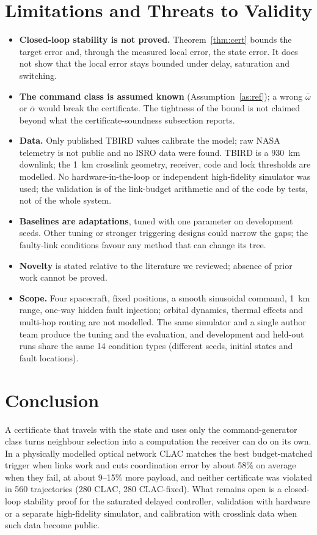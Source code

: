 \documentclass[journal]{IEEEtran}
\begin{document}
\section{Limitations and Threats to Validity}\label{sec:limits}
\begin{itemize}
\item \textbf{Closed-loop stability is not proved.} Theorem~\ref{thm:cert} bounds the target error and, through the measured local error, the state error. It does not show that the local error stays bounded under delay, saturation and switching.
\item \textbf{The command class is assumed known} (Assumption~\ref{as:ref}); a wrong $\bar\omega$ or $\bar\alpha$ would break the certificate. The tightness of the bound is not claimed beyond what the certificate-soundness subsection reports.
\item \textbf{Data.} Only published TBIRD values calibrate the model; raw NASA telemetry is not public and no ISRO data were found. TBIRD is a 930~km downlink; the 1~km crosslink geometry, receiver, code and lock thresholds are modelled. No hardware-in-the-loop or independent high-fidelity simulator was used; the validation is of the link-budget arithmetic and of the code by tests, not of the whole system.
\item \textbf{Baselines are adaptations}, tuned with one parameter on development seeds. Other tuning or stronger triggering designs could narrow the gaps; the faulty-link conditions favour any method that can change its tree.
\item \textbf{Novelty} is stated relative to the literature we reviewed; absence of prior work cannot be proved.
\item \textbf{Scope.} Four spacecraft, fixed positions, a smooth sinusoidal command, 1~km range, one-way hidden fault injection; orbital dynamics, thermal effects and multi-hop routing are not modelled. The same simulator and a single author team produce the tuning and the evaluation, and development and held-out runs share the same 14 condition types (different seeds, initial states and fault locations).
\end{itemize}

\section{Conclusion}
A certificate that travels with the state and uses only the command-generator class turns neighbour selection into a computation the receiver can do on its own. In a physically modelled optical network CLAC matches the best budget-matched trigger when links work and cuts coordination error by about 58\% on average when they fail, at about 9--15\% more payload, and neither certificate was violated in 560 trajectories (280 CLAC, 280 CLAC-fixed). What remains open is a closed-loop stability proof for the saturated delayed controller, validation with hardware or a separate high-fidelity simulator, and calibration with crosslink data when such data become public.
\end{document}
